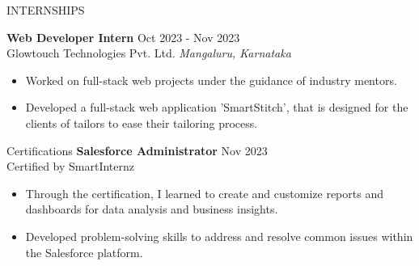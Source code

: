 \documentclass{resume} %
\begin{document}
\begin{rSection}{INTERNSHIPS}

\textbf{Web Developer Intern} \hfill Oct 2023 - Nov 2023\\
Glowtouch Technologies Pvt. Ltd. \hfill \textit{Mangaluru, Karnataka}
 \begin{itemize}
    \itemsep -3pt {} 
     \item Worked on full-stack web projects under the guidance of industry mentors.
    \item Developed a full-stack web application 'SmartStitch', that is designed for the clients of tailors to ease their tailoring process. 
 \end{itemize}
 


\end{rSection} 

\begin{rSection}{Certifications} 
    \textbf{Salesforce Administrator} \hfill Nov 2023\\
Certified by SmartInternz %
 \begin{itemize}
    \itemsep -3pt {} 
    \item Through the certification, I learned to create and customize reports and dashboards for data analysis and business insights. 
     \item Developed problem-solving skills to address and resolve common issues within the Salesforce platform.
 \end{itemize}
    
    
    \end{rSection}
    
\end{document}
